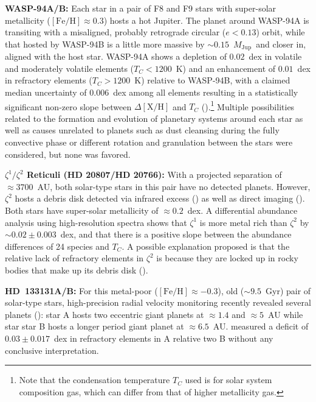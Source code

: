 \documentclass[modern, letterpaper]{aastex61}
\newcommand*\elem[1]{\ensuremath{\mathrm{#1}}}
\newcommand*\elemH[1]{\ensuremath{[\mathrm{#1}/\elem{H}]}}
\newcommand*{\feh}{\ensuremath{\elemH{Fe}}}
\newcommand{\Tcondens}{\ensuremath{T_C}}
\newcommand{\mjupiter}{\ensuremath{M_\mathrm{Jup}}}
\begin{document}
{\bf WASP-94A/B:}
Each star in a pair of F8 and F9 stars with super-solar metallicity
($\feh\approx 0.3$) hosts a hot Jupiter.
The planet around WASP-94A is transiting with a misaligned, probably retrograde
circular ($e<0.13$) orbit, while that hosted by WASP-94B is a little more
massive by $\sim 0.15$~\mjupiter\ and closer in, aligned with the host star.
WASP-94A shows a depletion of $0.02$~dex in volatile and moderately volatile
elements ($\Tcondens < 1200$~K) and an enhancement of $0.01$~dex in refractory
elements ($\Tcondens>1200$~K) relative to WASP-94B, with a claimed median
uncertainty of $0.006$~dex among all elements
resulting in a statistically significant non-zero slope between
$\Delta\elemH{X}$ and $\Tcondens$ (\citealt{Teske:2016aa}).\footnote{
  Note that the condensation
  temperature $\Tcondens$ used is for solar system composition
  gas, which can differ from that of higher metallicity gas.}
Multiple possibilities related to the formation and evolution
of planetary systems around each star as well as causes unrelated to planets
such as dust cleansing during the fully convective phase or different rotation
and granulation between the stars were considered, but none was favored.

{\bf $\zeta^1/\zeta^2$ Reticuli (HD 20807/HD 20766):}
With a projected separation of $\approx 3700$~AU, both solar-type stars in this pair have
no detected planets.
However, $\zeta^2$ hosts a debris disk detected via infrared excess
(\citealt{2008ApJ...674.1086T}) as well as direct imaging
(\citealt{2010A&A...518L.131E}).
Both stars have super-solar metallicity of $\approx 0.2$~dex.
A differential abundance analysis using high-resolution spectra
shows that $\zeta^1$ is more metal rich than $\zeta^2$ by $\sim 0.02 \pm 0.003$~dex,
and that there is a positive slope between the abundance differences of 24 species
and $\Tcondens$.
A possible explanation proposed is that the relative lack of refractory elements
in $\zeta^2$ is because they are locked up in rocky bodies
that make up its debris disk (\citealt{2016A&A...588A..81S}).

{\bf HD~133131A/B:}
For this metal-poor ($\feh\approx -0.3$), old ($\sim 9.5$~Gyr) pair of
solar-type stars, high-precision radial velocity monitoring recently revealed
several planets (\citealt{Teske:2016ab}): star A hosts two eccentric giant
planets at $\approx 1.4$ and $\approx 5$~AU while star star B hosts a longer
period giant planet at $\approx 6.5$~AU.
\citealt{Teske:2016ab} measured a deficit of $0.03 \pm 0.017$~dex in
refractory elements in A relative two B without any conclusive interpretation.
\end{document}
